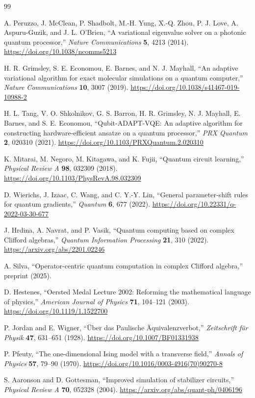 \documentclass[11pt]{article}
\begin{document}
\begin{thebibliography}{99}

A. Peruzzo, J. McClean, P. Shadbolt, M.-H. Yung, X.-Q. Zhou, P. J. Love, A. Aspuru-Guzik, and J. L. O'Brien,
``A variational eigenvalue solver on a photonic quantum processor,''
\emph{Nature Communications} \textbf{5}, 4213 (2014).
\url{https://doi.org/10.1038/ncomms5213}

H. R. Grimsley, S. E. Economou, E. Barnes, and N. J. Mayhall,
``An adaptive variational algorithm for exact molecular simulations on a quantum computer,''
\emph{Nature Communications} \textbf{10}, 3007 (2019).
\url{https://doi.org/10.1038/s41467-019-10988-2}

H. L. Tang, V. O. Shkolnikov, G. S. Barron, H. R. Grimsley, N. J. Mayhall, E. Barnes, and S. E. Economou,
``Qubit-ADAPT-VQE: An adaptive algorithm for constructing hardware-efficient ansatze on a quantum processor,''
\emph{PRX Quantum} \textbf{2}, 020310 (2021).
\url{https://doi.org/10.1103/PRXQuantum.2.020310}

K. Mitarai, M. Negoro, M. Kitagawa, and K. Fujii,
``Quantum circuit learning,''
\emph{Physical Review A} \textbf{98}, 032309 (2018).
\url{https://doi.org/10.1103/PhysRevA.98.032309}

D. Wierichs, J. Izaac, C. Wang, and C. Y.-Y. Lin,
``General parameter-shift rules for quantum gradients,''
\emph{Quantum} \textbf{6}, 677 (2022).
\url{https://doi.org/10.22331/q-2022-03-30-677}

J. Hrdina, A. Navrat, and P. Vasik,
``Quantum computing based on complex Clifford algebras,''
\emph{Quantum Information Processing} \textbf{21}, 310 (2022).
\url{https://arxiv.org/abs/2201.02246}

A. Silva,
``Operator-centric quantum computation in complex Clifford algebra,''
preprint (2025).

D. Hestenes,
``Oersted Medal Lecture 2002: Reforming the mathematical language of physics,''
\emph{American Journal of Physics} \textbf{71}, 104--121 (2003).
\url{https://doi.org/10.1119/1.1522700}

P. Jordan and E. Wigner,
``\"Uber das Paulische \"Aquivalenzverbot,''
\emph{Zeitschrift f\"ur Physik} \textbf{47}, 631--651 (1928).
\url{https://doi.org/10.1007/BF01331938}

P. Pfeuty,
``The one-dimensional Ising model with a transverse field,''
\emph{Annals of Physics} \textbf{57}, 79--90 (1970).
\url{https://doi.org/10.1016/0003-4916(70)90270-8}

S. Aaronson and D. Gottesman,
``Improved simulation of stabilizer circuits,''
\emph{Physical Review A} \textbf{70}, 052328 (2004).
\url{https://arxiv.org/abs/quant-ph/0406196}

\end{thebibliography}
\end{document}

